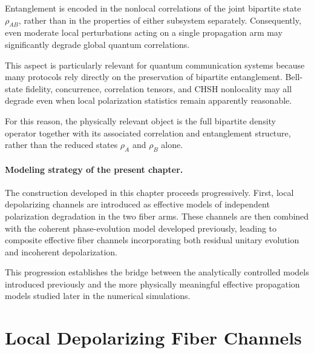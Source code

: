 Entanglement is encoded in the nonlocal correlations of the joint bipartite state \( \rho_{AB} \), rather than in the properties of either subsystem separately. Consequently, even moderate local perturbations acting on a single propagation arm may significantly degrade global quantum correlations.

\medskip

This aspect is particularly relevant for quantum communication systems because many protocols rely directly on the preservation of bipartite entanglement. Bell-state fidelity, concurrence, correlation tensors, and CHSH nonlocality may all degrade even when local polarization statistics remain apparently reasonable.

\medskip

For this reason, the physically relevant object is the full bipartite density operator together with its associated correlation and entanglement structure, rather than the reduced states \( \rho_A \) and \( \rho_B \) alone.

\medskip

\paragraph{Modeling strategy of the present chapter.}

The construction developed in this chapter proceeds progressively. First, local depolarizing channels are introduced as effective models of independent polarization degradation in the two fiber arms. These channels are then combined with the coherent phase-evolution model developed previously, leading to composite effective fiber channels incorporating both residual unitary evolution and incoherent depolarization.

\medskip

This progression establishes the bridge between the analytically controlled models introduced previously and the more physically meaningful effective propagation models studied later in the numerical simulations.


\section{Local Depolarizing Fiber Channels}
\label{sec:local_depolarizing_fiber_channels}

